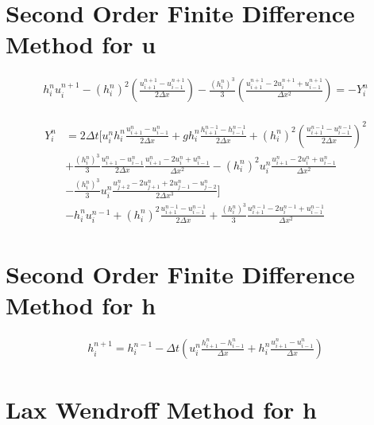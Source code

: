 \documentclass[12pt]{article}
\begin{document}
\section{Second Order Finite Difference Method for u}
\begin{gather}
	h^{n}_iu^{n+1}_i - \left(h^{n}_i\right)^2 \left(\frac{u^{n+1}_{i+1} -u^{n+1}_{i-1} }{2 \Delta x}\right) - \frac{\left(h^{n}_i\right)^3}{3}\left(\frac{u^{n+1}_{i+1} - 2u^{n+1}_{i} + u^{n+1}_{i-1} }{\Delta x^2}\right) = - Y^n_i 
	\label{eq:expandedutdisc3}
	\end{gather}

	\begin{gather}
	\begin{split}
	Y^n_i &= 2\Delta t \Bigg[u^n_ih^n_i \frac{u^{n}_{i+1} - u^{n}_{i-1}}{2\Delta x} + gh^n_i\frac{h^{n-1}_{i+1} - h^{n-1}_{i-1}}{2\Delta x} + \left(h^n_i\right)^2 \left(\frac{u^{n-1}_{i+1} - u^{n-1}_{i-1}}{2\Delta x} \right)^2 \\ &+ \frac{\left(h^n_i\right)^3}{3}\frac{u^{n}_{i+1} - u^{n}_{i-1}}{2\Delta x}\frac{u^{n}_{i+1} -2u^{n}_{i}   + u^{n}_{i-1}}{\Delta x^2} - \left(h^n_i\right)^2u^n_i\frac{u^{n}_{i+1} -2u^{n}_{i} + u^{n}_{i-1}}{\Delta x^2}  \\  &- \frac{\left(h^n_i\right)^3}{3}u^n_i\frac{ u^n_{j+2} - 2u^n_{j+1} + 2 u^n_{j-1} - u^n_{j-2}}{2 \Delta x^3} \Bigg] \\ &- h_i^{n}u_i^{n-1} + \left(h_i^{n}\right)^2\frac{u^{n-1}_{i+1} - u^{n-1}_{i-1}}{2\Delta x} + \frac{\left(h_i^{n}\right)^3}{3}\frac{u^{n-1}_{i+1} -2 u^{n-1}_{i} + u^{n-1}_{i-1}}{\Delta x^2}
	\end{split}
	\end{gather}

\section{Second Order Finite Difference Method for h}

	\begin{gather}
	h^{n+1}_i = h^{n-1}_i - \Delta t \left(u^{n}_{i}\frac{h^{n}_{i+1} - h^{n}_{i-1}}{\Delta x} + h^{n}_{i}\frac{u^{n}_{i+1} - u^{n}_{i-1}}{\Delta x}\right) 
	\end{gather}


\section{Lax Wendroff Method for h}
\end{document}
